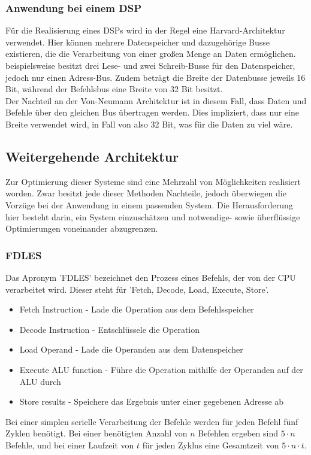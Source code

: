 \subsubsection{Anwendung bei einem DSP}
Für die Realisierung eines DSPs wird in der Regel eine Harvard-Architektur verwendet. Hier können mehrere Datenspeicher und dazugehörige Busse existieren, die die Verarbeitung von einer großen Menge an Daten ermöglichen. \cite{TI_c55x} beispielsweise besitzt drei Lese- und zwei Schreib-Busse für den Datenspeicher, jedoch nur einen Adress-Bus. Zudem beträgt die Breite der Datenbusse jeweils 16 Bit, während der Befehlsbus eine Breite von 32 Bit besitzt.\\
Der Nachteil an der Von-Neumann Architektur ist in diesem Fall, dass Daten und Befehle über den gleichen Bus übertragen werden.  Dies impliziert, dass nur eine Breite verwendet wird, in Fall von \cite{TI_c55x} also 32 Bit, was für die Daten zu viel wäre.

\subsection{Weitergehende Architektur}\label{2.4}
Zur Optimierung dieser Systeme sind eine Mehrzahl von Möglichkeiten realisiert worden. Zwar besitzt jede dieser Methoden Nachteile, jedoch überwiegen die Vorzüge bei der Anwendung in einem passenden System. Die Herausforderung hier besteht darin, ein System einzuschätzen und notwendige- sowie überflüssige Optimierungen voneinander abzugrenzen.

\subsubsection{FDLES}
Das Apronym 'FDLES' bezeichnet den Prozess eines Befehls, der von der CPU verarbeitet wird. Dieser steht für 'Fetch, Decode, Load, Execute, Store'.

\begin{itemize}
\item Fetch Instruction - Lade die Operation aus dem Befehlsspeicher
\item Decode Instruction - Entschlüssele die Operation
\item Load Operand - Lade die Operanden aus dem Datenspeicher
\item Execute ALU function - Führe die Operation mithilfe der Operanden auf der ALU durch
\item Store results - Speichere das Ergebnis unter einer gegebenen Adresse ab 
\end{itemize}
Bei einer simplen serielle Verarbeitung der Befehle werden für jeden Befehl fünf Zyklen benötigt. Bei einer benötigten Anzahl von $n$ Befehlen ergeben sind $5\cdot n$ Befehle, und bei einer Laufzeit von $t$ für jeden Zyklus eine Gesamtzeit von $5\cdot n\cdot t$.
